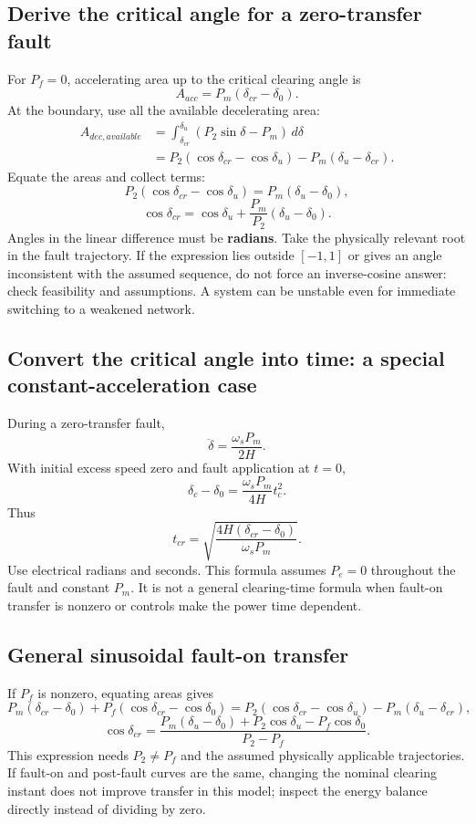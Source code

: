 \documentclass[11pt,a4paper]{article}
\newcommand{\ans}[1]{\boxed{#1}}
\begin{document}
\subsection{Derive the critical angle for a zero-transfer fault}
For $P_f=0$, accelerating area up to the critical clearing angle is
\[
A_{acc}=P_m(\delta_{cr}-\delta_0).
\]
At the boundary, use all the available decelerating area:
\begin{align*}
A_{dec,available}
&=\int_{\delta_{cr}}^{\delta_u}(P_2\sin\delta-P_m)\,d\delta\\
&=P_2(\cos\delta_{cr}-\cos\delta_u)
-P_m(\delta_u-\delta_{cr}).
\end{align*}
Equate the areas and collect terms:
\[
P_2(\cos\delta_{cr}-\cos\delta_u)=P_m(\delta_u-\delta_0),
\]
\[
\ans{\cos\delta_{cr}=\cos\delta_u+\frac{P_m}{P_2}(\delta_u-\delta_0)}.
\]
Angles in the linear difference must be \textbf{radians}. Take the physically relevant root in the fault trajectory. If the expression lies outside $[-1,1]$ or gives an angle inconsistent with the assumed sequence, do not force an inverse-cosine answer: check feasibility and assumptions. A system can be unstable even for immediate switching to a weakened network.
\subsection{Convert the critical angle into time: a special constant-acceleration case}
During a zero-transfer fault,
\[
\ddot\delta=\frac{\omega_sP_m}{2H}.
\]
With initial excess speed zero and fault application at $t=0$,
\[
\delta_c-\delta_0=\frac{\omega_sP_m}{4H}t_c^2.
\]
Thus
\[
\ans{t_{cr}=\sqrt{\frac{4H(\delta_{cr}-\delta_0)}{\omega_sP_m}}}.
\]
Use electrical radians and seconds. This formula assumes $P_e=0$ throughout the fault and constant $P_m$. It is not a general clearing-time formula when fault-on transfer is nonzero or controls make the power time dependent.
\subsection{General sinusoidal fault-on transfer}
If $P_f$ is nonzero, equating areas gives
\[
P_m(\delta_{cr}-\delta_0)+P_f(\cos\delta_{cr}-\cos\delta_0)
=P_2(\cos\delta_{cr}-\cos\delta_u)-P_m(\delta_u-\delta_{cr}),
\]
\[
\ans{\cos\delta_{cr}=\frac{P_m(\delta_u-\delta_0)+P_2\cos\delta_u-P_f\cos\delta_0}{P_2-P_f}}.
\]
This expression needs $P_2\ne P_f$ and the assumed physically applicable trajectories. If fault-on and post-fault curves are the same, changing the nominal clearing instant does not improve transfer in this model; inspect the energy balance directly instead of dividing by zero.
\end{document}
